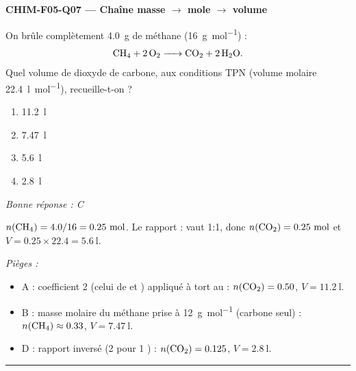 \documentclass[11pt,a4paper]{article}
\begin{document}
\noindent\textbf{CHIM-F05-Q07 --- Chaîne masse $\to$ mole $\to$ volume}\par
On brûle complètement \qty{4.0}{\gram} de méthane (\qty{16}{\gram\per\mole}) :
\[\ce{CH4 + 2 O2 -> CO2 + 2 H2O}.\]
Quel volume de dioxyde de carbone, aux conditions TPN (volume molaire \qty{22.4}{\litre\per\mole}), recueille-t-on ?
\begin{enumerate}[label=\Alph*)]
\item \qty{11.2}{\litre}
\item \qty{7.47}{\litre}
\item \qty{5.6}{\litre}
\item \qty{2.8}{\litre}
\end{enumerate}
\textit{Bonne réponse : C}\par
$n(\ce{CH4})=\num{4.0}/\num{16}=\num{0.25}~\si{\mole}$. Le rapport : vaut \num{1}:\num{1}, donc $n(\ce{CO2})=\num{0.25}~\si{\mole}$ et $V=\num{0.25}\times\num{22.4}=\qty{5.6}{\litre}$.\par
\textit{Pièges :}
\begin{itemize}
\item A : coefficient \num{2} (celui de  et ) appliqué à tort au  : $n(\ce{CO2})=\num{0.50}$, $V=\qty{11.2}{\litre}$.
\item B : masse molaire du méthane prise à \qty{12}{\gram\per\mole} (carbone seul) : $n(\ce{CH4})\approx\num{0.33}$, $V=\qty{7.47}{\litre}$.
\item D : rapport inversé (\num{2}  pour \num{1} ) : $n(\ce{CO2})=\num{0.125}$, $V=\qty{2.8}{\litre}$.
\end{itemize}
\vspace{6pt}\hrule\vspace{8pt}
\end{document}
